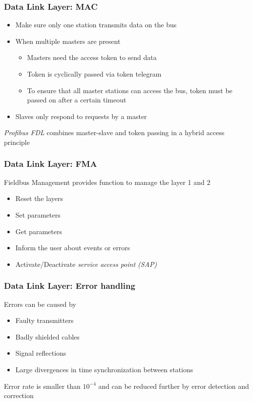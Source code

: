 \documentclass{beamer}
\begin{document}
\begin{frame}
  \frametitle{Data Link Layer: MAC}
  \begin{itemize}
    \item Make sure only one station transmits data on the bus
    \item When multiple masters are present
      \begin{itemize}
        \item Masters need the access token to send data
        \item Token is cyclically passed via token telegram
        \item To ensure that all master stations can access the bus, token must be passed
          on after a certain timeout
      \end{itemize}
    \item Slaves only respond to requests by a master
  \end{itemize}
  \textit{Profibus FDL} combines master-slave and token passing in a hybrid access principle
\end{frame}

\begin{frame}
  \frametitle{Data Link Layer: FMA}
  Fieldbus Management provides function to manage the layer 1 and 2
    \begin{itemize}
      \item Reset the layers
      \item Set parameters
      \item Get parameters
      \item Inform the user about events or errors
      \item Activate/Deactivate \textit{service access point (SAP)}
    \end{itemize}
\end{frame}

\begin{frame}
  \frametitle{Data Link Layer: Error handling}
  Errors can be caused by
  \begin{itemize}
    \item Faulty transmitters
    \item Badly shielded cables
    \item Signal reflections
    \item Large divergences in time synchronization between stations
  \end{itemize}
  Error rate is smaller than $10^{-4}$ and can be reduced further by error detection and
  correction
\end{frame}
\end{document}
